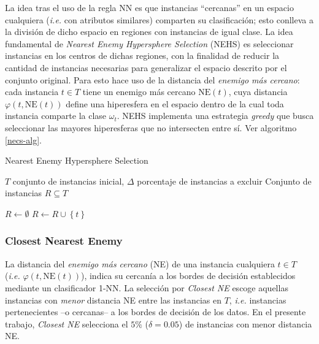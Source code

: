 La idea tras el uso de la regla NN es que instancias ``cercanas'' en un espacio cualquiera (\emph{i.e.} con atributos similares) comparten su clasificación; esto conlleva a la división de dicho espacio en regiones con instancias de igual clase. La idea fundamental de \emph{Nearest Enemy Hypersphere Selection} (NEHS) es seleccionar instancias en los centros de dichas regiones, con la finalidad de reducir la cantidad de instancias necesarias para generalizar el espacio descrito por el conjunto original. Para esto hace uso de la distancia del \emph{enemigo más cercano}: cada instancia $t \in T$ tiene un enemigo más cercano $\mathrm{NE}(t)$, cuya distancia $\varphi(t,\mathrm{NE}(t))$ define una hiperesfera en el espacio dentro de la cual toda instancia comparte la clase $\omega_t$. NEHS implementa una estrategia \emph{greedy} que busca seleccionar las mayores hiperesferas que no intersecten entre sí. Ver algoritmo \ref{necs-alg}.

\begin{algorithm}
\caption{Nearest Enemy Hypersphere Selection}
\label{necs-alg}
\begin{algorithmic}[1]

\Require $T$ conjunto de instancias inicial, $\Delta$ porcentaje de instancias a excluir
\Ensure Conjunto de instancias $R \subseteq T$

\State $R \gets \emptyset$
		\State $R \gets R \cup \left\lbrace t \right\rbrace$
	\EndIf
\EndFor
\State {}
\end{algorithmic}
\end{algorithm}

\subsubsection{Closest Nearest Enemy}

La distancia del \emph{enemigo más cercano} (NE) de una instancia cualquiera $t \in T$ (\emph{i.e.} $\varphi(t,\mathrm{NE}(t))$), indica su cercanía a los bordes de decisión establecidos mediante un clasificador 1-NN. La selección por \emph{Closest NE} escoge aquellas instancias con \emph{menor} distancia NE entre las instancias en $T$, \emph{i.e.} instancias pertenecientes --o cercanas-- a los bordes de decisión de los datos. En el presente trabajo, \emph{Closest NE} selecciona el $5\%$ ($\delta = 0.05$) de instancias con menor distancia NE.

